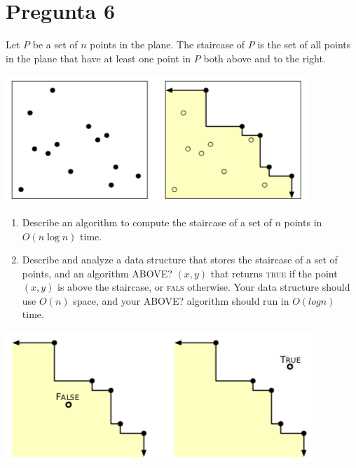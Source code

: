 \section*{Pregunta 6}
\noindent Let $P$ be a set of $n$ points in the plane. The staircase of $P$ is the set of all points in the plane that have at least one point in $P$ both above and to the right.
\begin{center}
    \includegraphics[scale=0.5]{escalera1}
\end{center}

\begin{enumerate}
    \item Describe an algorithm to compute the staircase of a set of $n$ points in $O(n \log n)$ time.
    
    \item Describe and analyze a data structure that stores the staircase of a set of points, and an algorithm ABOVE? $(x, y)$ that returns \textsc{true} if the point $(x, y)$ is above the staircase, or \textsc{fals} otherwise. Your data structure should use $O(n)$ space, and your ABOVE? algorithm should run in $O(log n)$ time.
\end{enumerate}

\begin{center}
    \includegraphics[scale=0.5]{escalera2}
\end{center}


